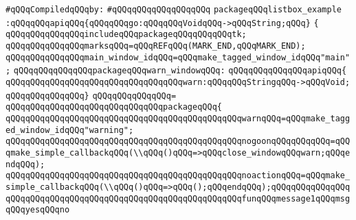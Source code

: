 \label{src/lib/tk/src/tests+examples/list_box_ex.pkg}
\newline
\verb|#qQQqCompiledqQQqby:|\newline
\verb|#qQQqqQQqqQQqqQQqqQQq|\newline
\newline
\verb|packageqQQqlistbox_example|\newline
\newline
\verb|:qQQqqQQqapiqQQq{qQQqqQQqgo:qQQqqQQqVoidqQQq->qQQqString;qQQq}|\newline
\newline
\verb|{|\newline
\verb|qQQqqQQqqQQqqQQqincludeqQQqpackageqQQqqQQqqQQqtk;|\newline
\newline
\verb|qQQqqQQqqQQqqQQqmarksqQQq=qQQqREFqQQq(MARK_END,qQQqMARK_END);|\newline
\newline
\verb|qQQqqQQqqQQqqQQqmain_window_idqQQq=qQQqmake_tagged_window_idqQQq"main";|\newline
\newline
\verb|qQQqqQQqqQQqqQQqpackageqQQqwarn_windowqQQq:|\newline
\verb|qQQqqQQqqQQqqQQqapiqQQq{|\newline
\verb|qQQqqQQqqQQqqQQqqQQqqQQqqQQqqQQqqQQqwarn:qQQqqQQqStringqQQq->qQQqVoid;|\newline
\verb|qQQqqQQqqQQqqQQq}|\newline
\verb|qQQqqQQqqQQqqQQq=|\newline
\verb|qQQqqQQqqQQqqQQqqQQqqQQqqQQqqQQqpackageqQQq{|\newline
\verb|qQQqqQQqqQQqqQQqqQQqqQQqqQQqqQQqqQQqqQQqqQQqqQQqwarnqQQq=qQQqmake_tagged_window_idqQQq"warning";|\newline
\verb|qQQqqQQqqQQqqQQqqQQqqQQqqQQqqQQqqQQqqQQqqQQqqQQqnogoonqQQqqQQqqQQq=qQQqmake_simple_callbackqQQq(\\qQQq()qQQq=>qQQqclose_windowqQQqwarn;qQQqendqQQq);|\newline
\verb|qQQqqQQqqQQqqQQqqQQqqQQqqQQqqQQqqQQqqQQqqQQqqQQqnoactionqQQq=qQQqmake_simple_callbackqQQq(\\qQQq()qQQq=>qQQq();qQQqendqQQq);qQQqqQQqqQQqqQQq|\newline
\newline
\verb|qQQqqQQqqQQqqQQqqQQqqQQqqQQqqQQqqQQqqQQqqQQqqQQqfunqQQqmessage1qQQqmsgqQQqyesqQQqno|\newline
